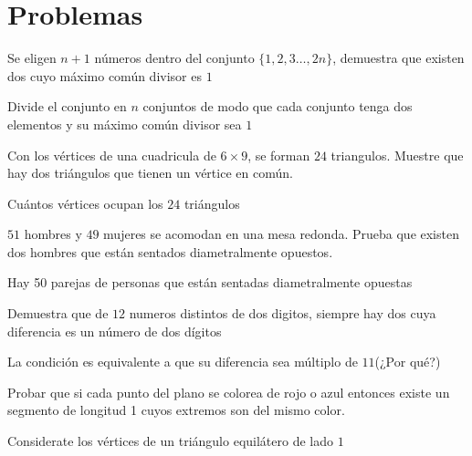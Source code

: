 \documentclass[11pt]{scrartcl}
\begin{document}
\section{Problemas}




\begin{problem}
Se eligen $n+1$ números dentro del conjunto $\{1,2,3\ldots, 2n\}$, demuestra que existen dos cuyo máximo común divisor es $1$

  \begin{hint}
  Divide el conjunto en $n$ conjuntos de modo que cada conjunto tenga dos elementos y su máximo común divisor sea $1$
  \end{hint}
\end{problem}
\vspace{0.1cm}
\begin{problem}
   Con los vértices de una cuadricula de $6\times 9$, se forman $24$ triangulos. Muestre que hay dos triángulos que tienen un vértice en común.
   \begin{hint}
       Cuántos vértices ocupan los $24$ triángulos
   \end{hint}
\end{problem}
\vspace{0.1cm}
\begin{problem}
     $51$ hombres y $49$ mujeres se acomodan en una mesa redonda. Prueba que existen dos hombres que están sentados diametralmente opuestos.
\begin{hint}
    Hay 50 parejas de personas que están sentadas diametralmente opuestas
\end{hint}
\end{problem}
\vspace{0.1cm}
\begin{problem}
    Demuestra que de $12$ numeros distintos de dos digitos, siempre hay dos cuya diferencia es un número de dos dígitos
    \begin{hint}
        La condición es equivalente a que su diferencia sea múltiplo de $11$(¿Por qué?)
    \end{hint}
\end{problem}
\vspace{0.1cm}
\begin{problem}
    Probar que si cada punto del plano se colorea de rojo o azul entonces existe un segmento de
longitud 1 cuyos extremos son del mismo color.
\begin{hint}
    Considerate los vértices de un triángulo equilátero de lado $1$
\end{hint}
\end{problem}
\end{document}
